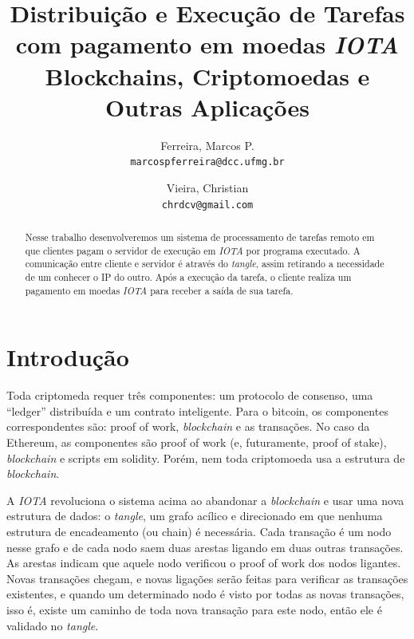 \documentclass[a4paper]{article}
\begin{document}
\title{%
  Distribuição e Execução de Tarefas com pagamento em moedas \textit{IOTA} \\
  \large Blockchains, Criptomoedas e Outras Aplicações}
    
\author{
  Ferreira, Marcos P.\\
  \texttt{marcospferreira@dcc.ufmg.br}
  \and
  Vieira, Christian \\
  \texttt{chrdcv@gmail.com}
}

\maketitle

\begin{abstract}
Nesse trabalho desenvolveremos um sistema de processamento de tarefas remoto em que clientes pagam o servidor
de execução em \textit{IOTA} por programa executado. A comunicação entre cliente e servidor é através do \textit{tangle}, assim
retirando a necessidade de um conhecer o IP do outro. Após a execução da tarefa, o cliente realiza um pagamento
em moedas \textit{IOTA} para receber a saída de sua tarefa.
\end{abstract}

\section{Introdução}\label{sec:Introduction}
Toda criptomeda requer três componentes: um protocolo de consenso, uma ``ledger'' distribuída e um contrato inteligente.
Para o bitcoin, os componentes correspondentes são: proof of work, \textit{blockchain} e as transações. No caso da Ethereum, as
componentes são proof of work (e, futuramente, proof of stake), \textit{blockchain} e scripts em solidity. Porém, nem toda criptomoeda
usa a estrutura de \textit{blockchain}.

A \textit{IOTA} revoluciona o sistema acima ao abandonar a \textit{blockchain} e usar uma nova estrutura de dados: o \textit{tangle}, um grafo acílico
e direcionado em que nenhuma estrutura de encadeamento (ou chain) é necessária. Cada transação é um nodo nesse grafo e de
cada nodo saem duas arestas ligando em duas outras transações. As arestas indicam que aquele nodo verificou o proof of work
dos nodos ligantes. Novas transações chegam, e novas ligações serão feitas para verificar as transações existentes, e quando
um determinado nodo é visto por todas as novas transações, isso é, existe um caminho de toda nova transação para este
nodo, então ele é validado no \textit{tangle}.
\end{document}
